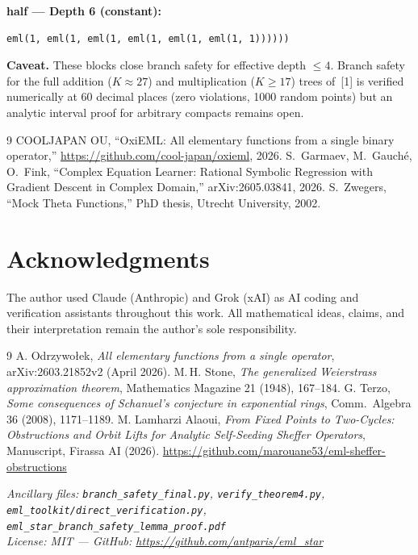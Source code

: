 \documentclass[11pt,a4paper]{article}
\begin{document}
\textbf{half --- Depth 6 (constant):}
\begin{verbatim}
eml(1, eml(1, eml(1, eml(1, eml(1, eml(1, 1))))))
\end{verbatim}

\textbf{Caveat.} These blocks close branch safety for effective depth $\leq 4$. Branch safety for the full addition ($K \approx 27$) and multiplication ($K \geq 17$) trees of~[1] is verified numerically at 60 decimal places (zero violations, 1000 random points) but an analytic interval proof for arbitrary compacts remains open.


\begin{thebibliography}{9}
 COOLJAPAN OU, ``OxiEML: All elementary functions from a single
  binary operator,'' \url{https://github.com/cool-japan/oxieml}, 2026.
 S.~Garmaev, M.~Gauch\'e, O.~Fink, ``Complex Equation Learner:
  Rational Symbolic Regression with Gradient Descent in Complex Domain,''
  arXiv:2605.03841, 2026.
 S.~Zwegers, ``Mock Theta Functions,'' PhD thesis,
  Utrecht University, 2002.
\end{thebibliography}

\section*{Acknowledgments}

The author used Claude (Anthropic) and Grok (xAI) as AI coding and verification assistants throughout this work. All mathematical ideas, claims, and their interpretation remain the author's sole responsibility.

\begin{thebibliography}{9}
 A. Odrzywołek, \textit{All elementary functions from a single operator}, arXiv:2603.21852v2 (April 2026).
 M.\,H. Stone, \textit{The generalized Weierstrass approximation theorem}, Mathematics Magazine 21 (1948), 167--184.
 G. Terzo, \textit{Some consequences of Schanuel's conjecture in exponential rings}, Comm.\ Algebra 36 (2008), 1171--1189.
 M. Lamharzi Alaoui, \textit{From Fixed Points to Two-Cycles: Obstructions and Orbit Lifts for Analytic Self-Seeding Sheffer Operators}, Manuscript, Firassa AI (2026). \url{https://github.com/marouane53/eml-sheffer-obstructions}
\end{thebibliography}

\bigskip
\noindent\textit{Ancillary files: \texttt{branch\_safety\_final.py}, \texttt{verify\_theorem4.py}, \texttt{eml\_toolkit/direct\_verification.py}, \texttt{eml\_star\_branch\_safety\_lemma\_proof.pdf}}\\
\noindent\textit{License: MIT --- GitHub: \url{https://github.com/antparis/eml_star}}
\end{document}
